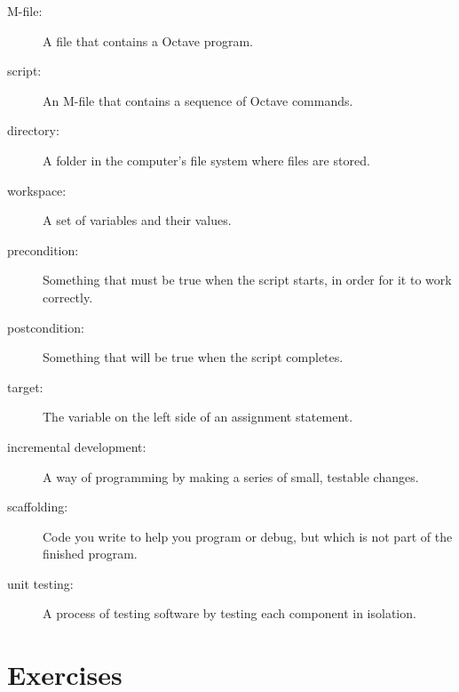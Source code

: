 \begin{description}

\item[M-file:] A file that contains a Octave program. 

\item[script:] An M-file that contains a sequence of Octave commands.

\item[directory:] A folder in the computer's file system where files are stored.

\item[workspace:] A set of variables and their values. 

\item[precondition:] Something that must be true when the script
starts, in order for it to work correctly.

\item[postcondition:] Something that will be true when the script
completes.

\item[target:] The variable on the left side of an assignment statement. 

\item[incremental development:] A way of programming by making a series
of small, testable changes. 

\item[scaffolding:] Code you write to help you program or debug, but
which is not part of the finished program. 

\item[unit testing:] A process of testing software by testing each
component in isolation.

\end{description}


\section{Exercises}

